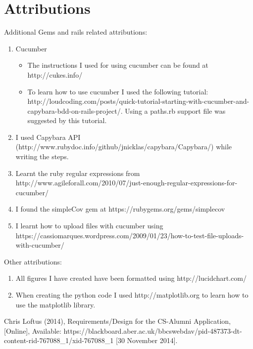 \documentclass[10pt,a4paper,titlepage]{article}
\begin{document}
\section{Attributions}

Additional Gems and rails related attributions:
\begin{enumerate}
\item Cucumber
\begin{itemize}
\item The instructions I used for using cucumber can be found at http://cukes.info/
\item To learn how to use cucumber I used the following tutorial: http://loudcoding.com/posts/quick-tutorial-starting-with-cucumber-and-capybara-bdd-on-rails-project/. Using a paths.rb support file was suggested by this tutorial.
\end{itemize}
\item I used Capybara API (http://www.rubydoc.info/github/jnicklas/capybara/Capybara/) while writing the steps.
\item Learnt the ruby regular expressions from http://www.agileforall.com/2010/07/just-enough-regular-expressions-for-cucumber/
\item I found the simpleCov gem at https://rubygems.org/gems/simplecov
\item I learnt how to upload files with cucumber using https://cassiomarques.wordpress.com/2009/01/23/how-to-test-file-uploads-with-cucumber/
\end{enumerate}

Other attributions:
	\begin{enumerate}
	\item All figures I have created have been formatted using http://lucidchart.com/ 
	\item When creating the python code I used http://matplotlib.org to learn how to use the matplotlib library.
	\end{enumerate}


\begin{thebibliography}{1}

Chris Loftus (2014), Requirements/Design for the CS-Alumni Application, [Online], Available: https://blackboard.aber.ac.uk/bbcswebdav/pid-487373-dt-content-rid-767088\_1/xid-767088\_1 [30 November 2014].



\end{thebibliography}
\end{document}
